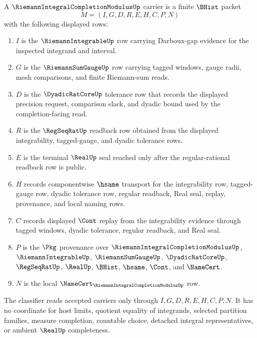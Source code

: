 \begin{definition}
\label{def:riemann-integral-completion-modulus-carrier}
A $\RiemannIntegralCompletionModulusUp$ carrier is a finite $\BHist$ packet
$$
M=(I,G,D,R,E,H,C,P,N)
$$
with the following displayed rows:
\begin{enumerate}
\item $I$ is the $\RiemannIntegrableUp$ row carrying Darboux-gap evidence for the inspected integrand and interval.
\item $G$ is the $\RiemannSumGaugeUp$ row carrying tagged windows, gauge radii, mesh comparisons, and finite Riemann-sum reads.
\item $D$ is the $\DyadicRatCoreUp$ tolerance row that records the displayed precision request, comparison slack, and dyadic bound used by the completion-facing read.
\item $R$ is the $\RegSeqRatUp$ readback row obtained from the displayed integrability, tagged-gauge, and dyadic tolerance rows.
\item $E$ is the terminal $\RealUp$ seal reached only after the regular-rational readback row is public.
\item $H$ records componentwise $\hsame$ transport for the integrability row, tagged-gauge row, dyadic tolerance row, regular readback, Real seal, replay, provenance, and local naming rows.
\item $C$ records displayed $\Cont$ replay from the integrability evidence through tagged windows, dyadic tolerance, regular readback, and Real seal.
\item $P$ is the $\Pkg$ provenance over $\RiemannIntegralCompletionModulusUp$, $\RiemannIntegrableUp$, $\RiemannSumGaugeUp$, $\DyadicRatCoreUp$, $\RegSeqRatUp$, $\RealUp$, $\BHist$, $\hsame$, $\Cont$, and $\NameCert$.
\item $N$ is the local $\NameCert_{\RiemannIntegralCompletionModulusUp}$ row.
\end{enumerate}
The classifier reads accepted carriers only through $I,G,D,R,E,H,C,P,N$. It has no coordinate for host limits, quotient equality of integrands, selected partition families, measure completion, countable choice, detached integral representatives, or ambient $\RealUp$ completeness.
\end{definition}

